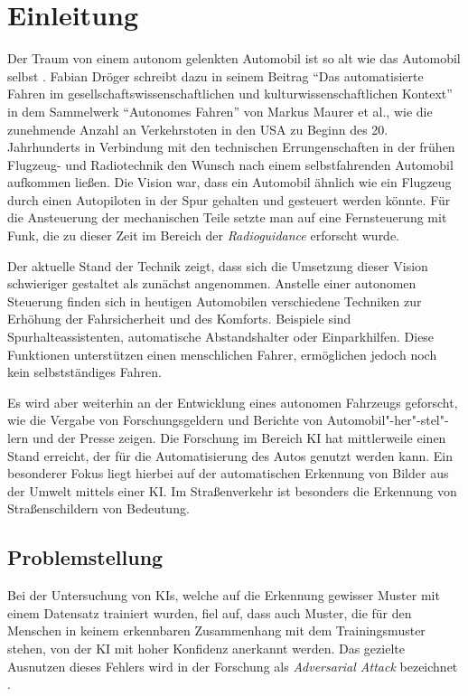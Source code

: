 \chapter{Einleitung}
\label{cha:Einleitung}
\setlength{\epigraphwidth}{4in}

Der Traum von einem autonom gelenkten Automobil ist so alt wie das Automobil selbst \cite{maurer_autonomes_2015}. Fabian Dröger schreibt dazu in seinem Beitrag "`Das automatisierte Fahren im gesellschaftswissenschaftlichen und kulturwissenschaftlichen Kontext"' in dem Sammelwerk "`Autonomes Fahren"' von Markus Maurer et al., wie die zunehmende Anzahl an Verkehrstoten in den USA zu Beginn des 20. Jahrhunderts in Verbindung mit den technischen Errungenschaften in der frühen Flugzeug- und Radiotechnik den Wunsch nach einem selbstfahrenden Automobil aufkommen ließen. Die Vision war, dass ein Automobil ähnlich wie ein Flugzeug durch einen Autopiloten in der Spur gehalten und gesteuert werden könnte. Für die Ansteuerung der mechanischen Teile setzte man auf eine Fernsteuerung mit Funk, die zu dieser Zeit im Bereich der \emph{Radioguidance} erforscht wurde.

Der aktuelle Stand der Technik zeigt, dass sich die Umsetzung dieser Vision schwieriger gestaltet als zunächst angenommen. Anstelle einer autonomen Steuerung finden sich in heutigen Automobilen verschiedene Techniken zur Erhöhung der Fahrsicherheit und des Komforts. Beispiele sind Spurhalteassistenten, automatische Abstandshalter oder Einparkhilfen. Diese Funktionen unterstützen einen menschlichen Fahrer, ermöglichen jedoch noch kein selbstständiges Fahren.

Es wird aber weiterhin an der Entwicklung eines autonomen Fahrzeugs geforscht, wie die Vergabe von Forschungsgeldern \cite{bmbf-internetredaktion_auto_nodate} und Berichte von Automobil"-her"-stel"-lern \cite{bmw_autonomes_nodate} und der Presse \cite{efler_autonomes_2018} zeigen. Die Forschung im Bereich \ac{KI} hat mittlerweile einen Stand erreicht, der für die Automatisierung des Autos genutzt werden kann. Ein besonderer Fokus liegt hierbei auf der automatischen Erkennung von Bilder aus der Umwelt mittels einer \ac{KI}. Im Straßenverkehr ist besonders die Erkennung von Straßenschildern von Bedeutung.


\section{Problemstellung}
\label{sec:Problemstellung}
Bei der Untersuchung von \acp{KI}, welche auf die Erkennung gewisser Muster mit einem Datensatz trainiert wurden, fiel auf, dass auch Muster, die für den Menschen in keinem erkennbaren Zusammenhang mit dem Trainingsmuster stehen, von der \ac{KI} mit hoher Konfidenz anerkannt werden. Das gezielte Ausnutzen dieses Fehlers wird in der Forschung als \textit{Adversarial Attack} bezeichnet \cite{DBLP:journals/corr/HuangPGDA17}.


